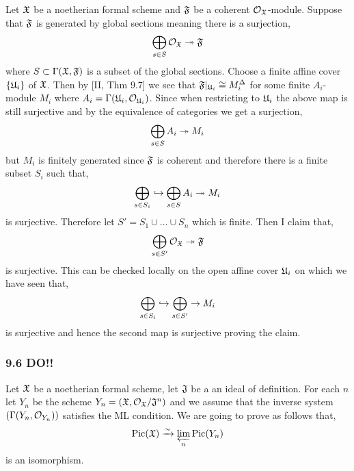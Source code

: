 \documentclass[12pt]{article}
\begin{document}
Let $\mathfrak{X}$ be a noetherian formal scheme and $\mathfrak{F}$ be a coherent $\mathcal{O}_{\mathfrak{X}}$-module. Suppose that $\mathfrak{F}$ is generated by global sections meaning there is a surjection,
\[ \bigoplus_{s \in S} \mathcal{O}_{\mathfrak{X}} \twoheadrightarrow \mathfrak{F} \]
where $S \subset \Gamma(\mathfrak{X}, \mathfrak{F})$ is a subset of the global sections. Choose a finite affine cover $\{ \mathfrak{U}_i \}$ of $\mathfrak{X}$. Then by [II, Thm 9.7] we see that $\mathfrak{F}|_{\mathfrak{U}_i} \cong M_i^\Delta$ for some finite $A_i$-module $M_i$ where $A_i = \Gamma(\mathfrak{U}_i, \mathcal{O}_{\mathfrak{U}_i})$. Since when restricting to $\mathfrak{U}_i$ the above map is still surjective and by the equivalence of categories we get a surjection,
\[ \bigoplus_{s \in S} A_i \twoheadrightarrow M_i \]
but $M_i$ is finitely generated since $\mathfrak{F}$ is coherent and therefore there is a finite subset $S_i$ such that,
\[ \bigoplus_{s \in S_i} \hookrightarrow \bigoplus_{s \in S} A_i \twoheadrightarrow M_i \]
is surjective. Therefore let $S' = S_1 \cup \dots \cup S_n$ which is finite. Then I claim that,
\[ \bigoplus_{s \in S'} \mathcal{O}_{\mathfrak{X}} \twoheadrightarrow \mathfrak{F} \]
is surjective. This can be checked locally on the open affine cover $\mathfrak{U}_i$ on which we have seen that,
\[ \bigoplus_{s \in S_i} \hookrightarrow \bigoplus_{s \in S'} \to M_i \]
is surjective and hence the second map is surjective proving the claim. 

\subsubsection{9.6 DO!!}

Let $\mathfrak{X}$ be a noetherian formal scheme, let $\mathfrak{J}$ be a an ideal of definition. For each $n$ let $Y_n$ be the scheme $Y_n = (\mathfrak{X}, \mathcal{O}_{\mathfrak{X}} / \mathfrak{J}^n)$ and we assume that the inverse system $( \Gamma(Y_n, \mathcal{O}_{Y_n}))$ satisfies the ML condition. We are going to prove as follows that,
\[ \mathrm{Pic}(\mathfrak{X}) \xrightarrow{\sim} \varprojlim_n \mathrm{Pic}(Y_n) \]
is an isomorphism.
\end{document}
